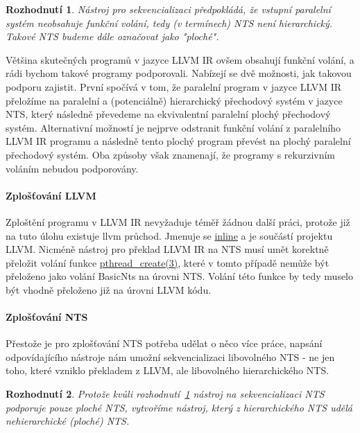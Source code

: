 \documentclass[10pt,a4paper,notitlepage]{report}
\newtheorem{decision}  {Rozhodnutí}
\begin{document}
\begin{decision}\label{decision:sequentialize-flat-llvm}
Nástroj pro sekvencializaci předpokládá, že vstupní paralelní systém neobsahuje funkční volání, tedy (v termínech) NTS není hierarchický. Takové NTS budeme dále označovat jako "ploché".
\end{decision}

Většina skutečných programů v jazyce LLVM IR ovšem obsahují funkční volání, a rádi bychom takové programy podporovali. Nabízejí se dvě možnosti, jak takovou podporu zajistit. První spočívá v tom, že paralelní program v jazyce LLVM IR přeložíme na paralelní a (potenciálně) hierarchický přechodový systém v jazyce NTS, který následně převedeme na ekvivalentní paralelní plochý přechodový systém. Alternativní možností je nejprve odstranit funkční volání z paralelního LLVM IR programu a následně tento plochý program převést na plochý paralelní přechodový systém. Oba způsoby však znamenají, že programy s rekurzivním voláním nebudou podporovány.

\paragraph{Zplošťování LLVM}
Zploštění programu v LLVM IR nevyžaduje téměř žádnou další práci, protože již na tuto úlohu existuje llvm průchod. Jmenuje se
\href{http://llvm.org/docs/Passes.html#inline-function-integration-inlining}
{inline} a je součástí projektu LLVM. Nicméně nástroj pro překlad LLVM IR na NTS musí umět korektně přeložit volání funkce
\href{http://man7.org/linux/man-pages/man3/pthread\_create.3.html}
{pthread\_create(3)}, které v tomto případě nemůže být přeloženo jako volání BasicNts na úrovni NTS. Volání této funkce by tedy muselo být vhodně přeloženo již na úrovni LLVM kódu.

\paragraph{Zplošťování NTS}
Přestože je pro zplošťování NTS potřeba udělat o něco více práce, napsání odpovídajícího nástroje nám umožní sekvencializaci libovolného NTS - ne jen toho, které vzniklo překladem z LLVM, ale libovolného hierarchického NTS.

\begin{decision}\label{decision:do-nts-flattening}
Protože kvůli rozhodnutí~\ref{decision:sequentialize-flat-llvm} nástroj na sekvencializaci NTS podporuje pouze ploché NTS, vytvoříme nástroj, který z hierarchického NTS udělá nehierarchické (ploché) NTS.
\end{decision}
\end{document}
